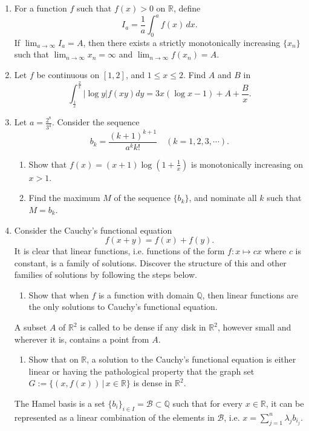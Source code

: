 \documentclass[10pt]{article}
\begin{document}
\begin{CJK*}{UTF8}{gbsn}
\begin{enumerate}
\item For a function $f$ such that $f(x)>0$ on $\mathbb{R}$, define $$I_a=\frac{1}{a}\int_0^af(x)\,dx.$$ If $\lim_{a\to\infty}I_a=A$, then there exists a strictly monotonically increasing $\{x_n\}$ such that $\lim_{n\to\infty}x_n=\infty$ and $\lim_{n\to\infty}f(x_n)=A$.
\item Let $f$ be continuous on $[1,2]$, and $1\leq x\leq 2$. Find $A$ and $B$ in $$\int_{\frac{1}{x}}^{\frac{2}{x}}|\log y| f(x y) d y=3 x(\log x-1)+A+\frac{B}{x}.$$
\item Let $a=\frac{2^{8}}{3^{4}}$. Consider the sequence $$b_{k}=\frac{(k+1)^{k+1}}{a^{k} k !}\quad(k=1,2,3, \cdots).$$
\begin{enumerate}[label=\alph*.]
\item Show that $f(x)=(x+1) \log \left(1+\frac{1}{x}\right)$ is monotonically increasing on $x>1$.
\item Find the maximum $M$ of the sequence $\{b_k\}$, and nominate all $k$ such that $M=b_k$.
\end{enumerate}
\item Consider the Cauchy's functional equation $$f(x+y)=f(x)+f(y).$$ It is clear that linear functions, i.e. functions of the form $f:x\mapsto cx$ where $c$ is constant, is a family of solutions. Discover the structure of this and other families of solutions by following the steps below.
\begin{enumerate}[label=\alph*.]
\item Show that when $f$ is a function with domain $\mathbb{Q}$, then linear functions are the only solutions to Cauchy's functional equation.
\end{enumerate}

A subset $A$ of $\mathbb{R}^2$ is called to be dense if any disk in $\mathbb{R}^2$, however small and wherever it is, contains a point from $A$.

\begin{enumerate}[resume, label=\alph*.]
\item Show that on $\mathbb{R}$, a solution to the Cauchy's functional equation is either linear or having the pathological property that the graph set $G:=\{(x,f(x))\,|\,x\in\mathbb{R}\}$ is dense in $\mathbb{R}^2$.
\end{enumerate}

The Hamel basis is a set $\{b_i\}_{i\in I}=\mathcal{B}\subset\mathbb{Q}$ such that for every $x\in\mathbb{R}$, it can be represented as a linear combination of the elements in $\mathcal{B}$, i.e. $x=\sum_{j=1}^n\lambda_jb_{i_j}$.


\end{enumerate}
\end{CJK*}
\end{document}
